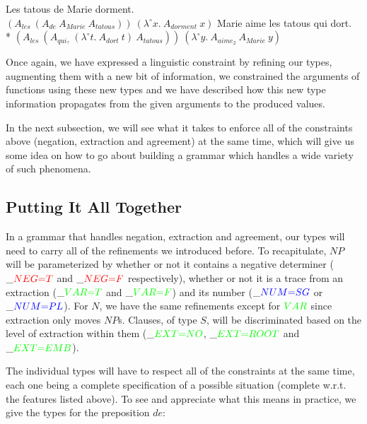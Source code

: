 \begin{exe}
  \ex \label{ex:good-agr} Les tatous de Marie dorment. \\
      $(A_{les}\ (A_{de}\ A_{Marie}\ A_{tatous}))\ (\lambda^{\circ} x.\ A_{dorment}\ x)$
  \ex * \label{ex:bad-agr} Marie aime les tatous qui dort. \\
      * $(A_{les}\ (A_{qui_?}\ (\lambda^{\circ} t.\ A_{dort}\ t)\ A_{tatous}))\ (\lambda^{\circ} y.\ A_{aime_2}\ A_{Marie}\ y)$
\end{exe}

Once again, we have expressed a linguistic constraint by refining our
types, augmenting them with a new bit of information, we constrained the
arguments of functions using these new types and we have described how
this new type information propagates from the given arguments to the
produced values.

In the next subsection, we will see what it takes to enforce all of the
constraints above (negation, extraction and agreement) at the same time,
which will give us some idea on how to go about building a grammar which
handles a wide variety of such phenomena.


\subsection{Putting It All Together}

In a grammar that handles negation, extraction and agreement, our types
will need to carry all of the refinements we introduced before. To
recapitulate, $NP$ will be parameterized by whether or not it contains a
negative determiner ($\_\textcolor{red}{NEG{=}T}$ and
$\_\textcolor{red}{NEG{=}F}$ respectively), whether or not it is a trace
from an extraction ($\_\textcolor{green}{VAR{=}T}$ and
$\_\textcolor{green}{VAR{=}F}$) and its number
($\_\textcolor{blue}{NUM{=}SG}$ or $\_\textcolor{blue}{NUM{=}PL}$). For
$N$, we have the same refinements except for $\textcolor{green}{VAR}$
since extraction only moves $NP$s. Clauses, of type $S$, will be
discriminated based on the level of extraction within them
($\_\textcolor{green}{EXT{=}NO}$, $\_\textcolor{green}{EXT{=}ROOT}$ and
$\_\textcolor{green}{EXT{=}EMB}$).

The individual types will have to respect all of the constraints at the
same time, each one being a complete specification of a possible
situation (complete w.r.t. the features listed above). To see and
appreciate what this means in practice, we give the types for the
preposition $de$:

